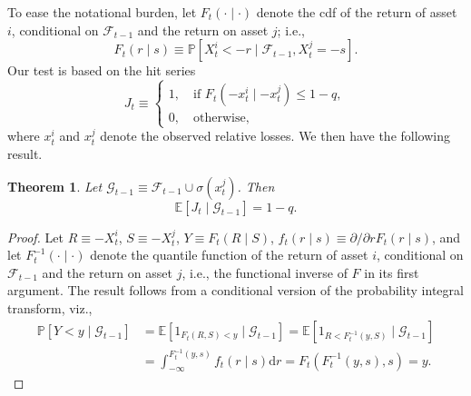 \documentclass[12pt]{article}
\newtheorem{theorem}{Theorem}
\begin{document}
To ease the notational burden, let $F_t(\cdot\mid\cdot)$ denote the cdf of the return of asset $i$, conditional on $\mathcal{F}_{t-1}$ and the return on asset $j$; i.e.,
\[
 F_t(r\mid s)\equiv \mathbb{P}\left[X^{i}_t<-r\mid \mathcal{F}_{t-1}, X^{j}_t = -s \right].
\]
Our test is based on the hit series
\[
J_t\equiv \begin{cases}1,\quad \mbox{if } F_t (-x^{i}_t\mid -x^{j}_t) \leq 1-q,\\0,\quad \mbox{otherwise,}\end{cases}
\]
where $x^{i}_t$ and $x^{j}_t$ denote the observed relative losses. We then have the following result.
\begin{theorem}\label{th1}
Let $\mathcal{G}_{t-1}\equiv \mathcal{F}_{t-1} \cup \sigma(x^j_t)$. Then
\[\mathbb{E}[J_t\mid \mathcal{G}_{t-1}]=1-q. \]
\end{theorem}
\begin{proof}
Let $R\equiv -X^{i}_t$, $S\equiv -X^{j}_t$, $Y\equiv F_t (R\mid S)$, $f_t(r\mid s)\equiv \partial/\partial r F_t(r\mid s)$, and let $F^{-1}_t(\cdot\mid\cdot)$ denote the quantile function of the return of asset $i$, conditional on $\mathcal{F}_{t-1}$ and the return on asset $j$, i.e., the functional inverse of $F$ in its first argument.  The result follows from a conditional version of the probability integral transform, viz.,
\begin{align*}
\mathbb{P}\left[Y<y\mid \mathcal{G}_{t-1}\right]&=\mathbb{E}\left[1_{F_t(R, S)<y}\mid \mathcal{G}_{t-1}\right]=\mathbb{E}\left[1_{R<F_t^{-1}(y, S)}\mid \mathcal{G}_{t-1}\right]\\
&=\int_{-\infty}^{F_t^{-1}(y, s)}f_t(r\mid s)\mathrm{d}r
=F_t(F^{-1}_t(y, s), s)=y.
\end{align*}\end{proof}
%
\end{document}
